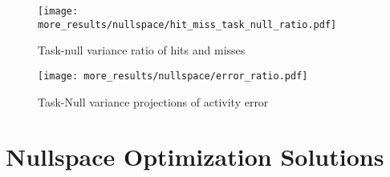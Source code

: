 \documentclass[../main.tex]{subfiles}
\begin{document}
\begin{figure}[tph]
  \centering
    \texttt{[image: more\_results/nullspace/hit\_miss\_task\_null\_ratio.pdf]}
    \caption[Task-null variance ratio of hits and misses]{Task-null variance ratio of hits and misses}\label{fig:hit_miss_nullspace}
\end{figure}

\begin{figure}[tph]
  \centering
    \texttt{[image: more\_results/nullspace/error\_ratio.pdf]}
    \caption[Task-Null variance projections of activity error]{Task-Null variance projections of activity error}\label{fig:error_nullspace_subjects}
\end{figure}








\section{Nullspace Optimization Solutions}
\end{document}
